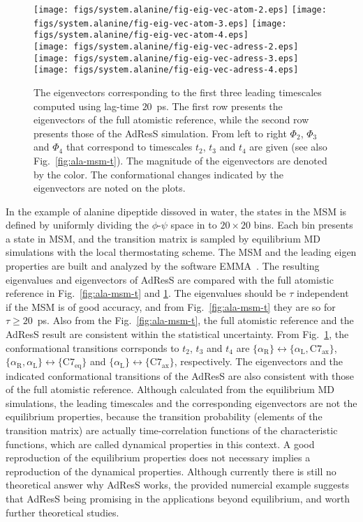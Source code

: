 \documentclass[epjST]{svjour}
\newcommand{\confa}[0]{{\alpha_{\textrm{R}}}}
\newcommand{\confb}[0]{{\textrm{C}7_{\textrm{eq}}}}
\newcommand{\confc}[0]{{\alpha_{\textrm{L}}}}
\newcommand{\confd}[0]{{\textrm{C}7_{\textrm{ax}}}}
\begin{document}
\begin{figure}
  \centering
  \texttt{[image: figs/system.alanine/fig-eig-vec-atom-2.eps]}
  \texttt{[image: figs/system.alanine/fig-eig-vec-atom-3.eps]}
  \texttt{[image: figs/system.alanine/fig-eig-vec-atom-4.eps]}\\[-.4cm]
  \texttt{[image: figs/system.alanine/fig-eig-vec-adress-2.eps]}
  \texttt{[image: figs/system.alanine/fig-eig-vec-adress-3.eps]}
  \texttt{[image: figs/system.alanine/fig-eig-vec-adress-4.eps]}\\
  \caption{The eigenvectors corresponding to the first three leading timescales computed using lag-time $20$~ps.
    The first row presents the eigenvectors of the full atomistic reference, while the second
    row presents those of the AdResS simulation. From left to right $\Phi_2$, $\Phi_3$ and $\Phi_4$ that correspond to
    timescales $t_2$, $t_3$ and $t_4$ are given (see also Fig.~\ref{fig:ala-msm-t}). The magnitude of the eigenvectors are
    denoted by the color. 
    The conformational
    changes indicated by the eigenvectors are noted on the plots.}
  \label{fig:ala-msm-v}
\end{figure}


In the example of alanine dipeptide dissoved in water, the states in the MSM
is defined by uniformly dividing the $\phi$-$\psi$ space in to $20\times 20$ bins.
Each bin presents a state in MSM, and the transition matrix is sampled by equilibrium
MD simulations with the local thermostating scheme.
The MSM and the leading eigen properties are built and analyzed by the software EMMA~\cite{senne2012emma}.
The resulting eigenvalues and eigenvectors of AdResS are compared with the full atomistic reference in
Fig.~\ref{fig:ala-msm-t} and \ref{fig:ala-msm-v}. The
eigenvalues should be $\tau$ independent if the MSM is of good
accuracy, and from Fig.~\ref{fig:ala-msm-t} they are so for $\tau \geq 20$~ps.
Also from the Fig.~\ref{fig:ala-msm-t}, the full atomistic
reference and the AdResS result are consistent within the statistical
uncertainty.
From Fig.~\ref{fig:ala-msm-v}, the conformational transitions corrsponds
to $t_2$, $t_3$ and $t_4$ are $\{\confa \} \leftrightarrow \{\confc,\confd\}$,
$\{\confa, \confc \} \leftrightarrow \{\confb\}$ and $\{\confc \} \leftrightarrow \{\confd\}$, respectively.
The eigenvectors and the indicated conformational transitions of the AdResS are also consistent with
those of the full atomistic reference. Although calculated from the
equilibrium MD simulations, the leading timescales and the
corresponding eigenvectors are not the equilibrium properties, because
the transition probability (elements of the transition matrix) are actually
time-correlation functions of the characteristic functions, which are called dynamical properties in
this context. A good reproduction of the equilibrium properties does
not necessary implies a reproduction of the dynamical properties.
Although currently there is still no theoretical answer why AdResS works,
the provided numercial example suggests that AdResS being promising in the applications beyond equilibrium,
and  worth further theoretical studies.
\end{document}
